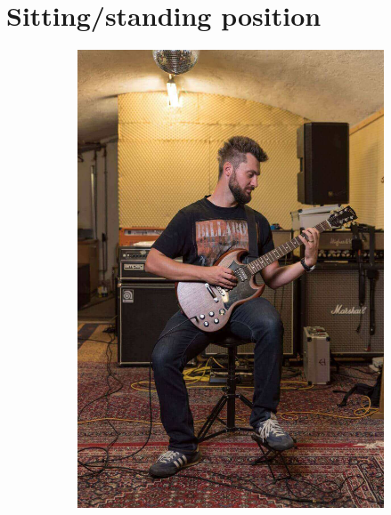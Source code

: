 \section{Sitting/standing position}

\begin{figure}[h]
  \begin{subfigure}[b]{0.45\textwidth}
    \includegraphics[width=\textwidth]{../Images/Letty_Guitar-Shooting_sitting.jpg}
    \caption{}
    \label{fig:positin_sitting}
  \end{subfigure}
  \hfill
  \begin{subfigure}[b]{0.45\textwidth}

\end{subfigure}
\end{figure}
